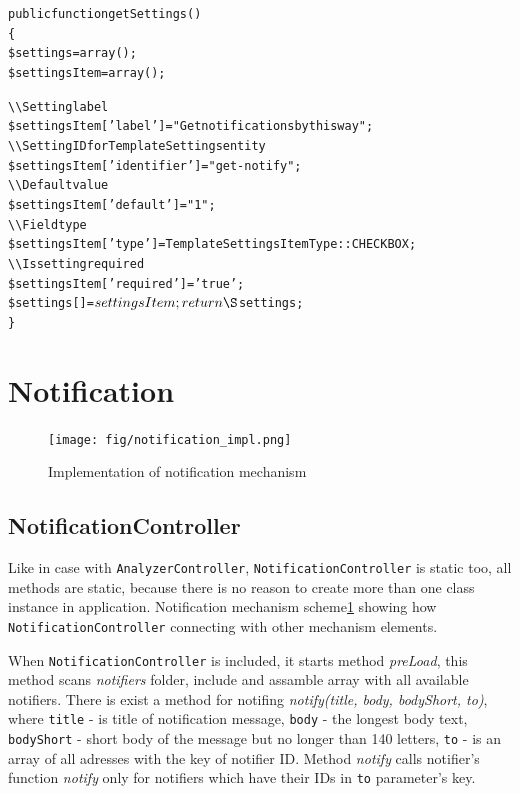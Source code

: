 \begin{alltt}
public function getSettings()
\{
    \$settings = array();
    \$settingsItem = array();

    \textbackslash\textbackslash Setting label
    \$settingsItem['label'] = "Get notifications by this way";
    \textbackslash\textbackslash Setting ID for TemplateSettings entity
    \$settingsItem['identifier'] = "get-notify";
    \textbackslash\textbackslash Default value
    \$settingsItem['default'] = "1";
    \textbackslash\textbackslash Field type
    \$settingsItem['type'] = TemplateSettingsItemType::CHECKBOX;
    \textbackslash\textbackslash Is setting required
    \$settingsItem['required'] = 'true';
    \$settings[] = $settingsItem;

    return \S$settings; 
\}
\end{alltt}

\section{Notification}

\begin{figure}[hb]
  \centering
    \texttt{[image: fig/notification\_impl.png]}
  \caption{Implementation of notification mechanism}
  \label{fig:not_impl}
\end{figure}

\subsection{NotificationController}

Like in case with \texttt{AnalyzerController}, \texttt{NotificationController} is static too, all methods are static, because there is no reason to create more than one class instance in application. Notification mechanism scheme\ref{fig:not_impl} showing how \texttt{NotificationController} connecting with other mechanism elements.

When \texttt{NotificationController} is included, it starts method \emph{preLoad}, this method scans \emph{notifiers} folder, include and assamble array with all available notifiers. There is exist a method for notifing \emph{notify(title, body, bodyShort, to)}, where \texttt{title} - is title of notification message, \texttt{body} - the longest body text, \texttt{bodyShort} - short body of the message but no longer than 140 letters, \texttt{to} - is an array of all adresses with the key of notifier ID. Method \emph{notify} calls notifier's function \emph{notify} only for notifiers which have their IDs in \texttt{to} parameter's key.

